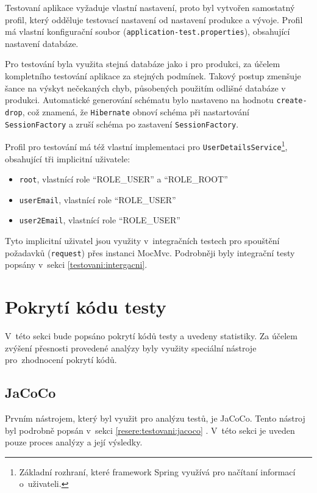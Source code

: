     Testovaní aplikace vyžaduje vlastní nastavení, proto byl vytvořen samostatný profil, který odděluje testovací nastavení od nastavení produkce a vývoje. Profil má vlastní konfigurační soubor (\verb|application-test.properties|), obsahující nastavení databáze.
    
    Pro testování byla využita stejná databáze jako i pro produkci, za účelem kompletního testování aplikace za stejných podmínek. Takový postup zmenšuje šance na výskyt nečekaných chyb, působených použitím odlišné databáze v produkci. Automatické generování schématu bylo nastaveno na hodnotu \verb|create-drop|, což znamená, že \verb|Hibernate| obnoví schéma při nastartování \verb|SessionFactory| a zruší schéma po zastavení \verb|SessionFactory|.
    
    Profil pro testování má též vlastní implementaci pro \verb|UserDetailsService|\footnote{Základní rozhraní, které framework Spring využívá pro načítaní informací o~uživateli.}, obsahující tři implicitní uživatele:
    \begin{itemize}
            \item \verb|root|, vlastnící role \enquote{ROLE\_USER} a \enquote{ROLE\_ROOT} 
            \item \verb|userEmail|, vlastnící role \enquote{ROLE\_USER}
            \item \verb|user2Email|, vlastnící role \enquote{ROLE\_USER}
    \end{itemize}
    Tyto implicitní uživatel jsou využity v~integračních testech pro spouštění požadavků (\verb|request|) přes instanci MocMvc. Podrobněji byly integrační testy popsány v~sekci \ref{testovani:intergacni}.
    
\section{Pokrytí kódu testy}\label{testovani:pokryti}
    V~této sekci bude popsáno pokrytí kódů testy a uvedeny statistiky. Za účelem zvýšení přesnosti provedené analýzy byly využity speciální nástroje pro~zhodnocení pokrytí kódů.
    
    \subsection{JaCoCo}
    Prvním nástrojem, který byl využit pro analýzu testů, je JaCoCo. Tento nástroj byl podrobně popsán v~sekci \ref{resere:testovani:jacoco} . V~této sekci je uveden pouze proces analýzy a její výsledky.
    

